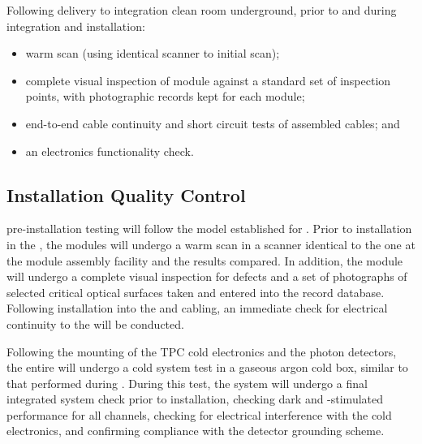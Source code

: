 Following delivery to integration clean room underground, prior to and during integration and installation:
\begin{itemize}
\item warm scan (using identical scanner to initial scan);
\item complete visual inspection of module against a standard set of inspection points, with photographic records kept for each module;
\item end-to-end cable continuity and short circuit tests of assembled cables; and
\item an  electronics functionality check.
\end{itemize}

\subsection{Installation Quality Control}
\label{sec:fdsp-pd-installqc}

 pre-installation testing will follow the model established for .  Prior to installation in the , the  modules will undergo a warm scan in a scanner identical to the one at the  module assembly facility and the results compared.  In addition, the module will undergo a complete visual inspection for defects and a set of photographs of selected critical optical surfaces taken and entered into the  record database.  Following installation into the  and cabling, an immediate check for electrical continuity to the  will be conducted.

Following the mounting of the TPC cold electronics and the photon detectors, the entire  will undergo a cold system test in a gaseous argon cold box, similar to that performed during .  During this test, the  system will undergo a final integrated system check prior to installation, checking dark and -stimulated  performance for all channels, checking for electrical interference with the cold electronics, and confirming compliance with the detector grounding scheme.